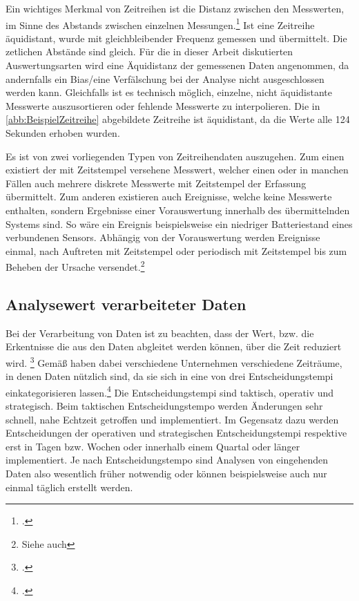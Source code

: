 Ein wichtiges Merkmal von Zeitreihen ist die Distanz zwischen den Messwerten, im Sinne des Abstands zwischen einzelnen Messungen.\footcite[Vgl. auch im Folgenden][201\psq]{Mosler.2006} Ist eine Zeitreihe äquidistant, wurde mit gleichbleibender Frequenz gemessen und übermittelt. Die zetlichen Abstände sind gleich. Für die in dieser Arbeit diskutierten Auswertungsarten wird eine Äquidistanz der gemessenen Daten angenommen, da andernfalls ein Bias/eine Verfälschung bei der Analyse nicht ausgeschlossen werden kann. Gleichfalls ist es technisch möglich, einzelne, nicht äquidistante Messwerte auszusortieren oder fehlende Messwerte zu interpolieren. Die in \autoref{abb:BeispielZeitreihe} abgebildete Zeitreihe ist äquidistant, da die Werte alle 124 Sekunden erhoben wurden.

Es ist von zwei vorliegenden Typen von Zeitreihendaten auszugehen. Zum einen existiert der mit Zeitstempel versehene Messwert, welcher einen oder in manchen Fällen auch mehrere diskrete Messwerte mit Zeitstempel der Erfassung übermittelt. 
Zum anderen existieren auch Ereignisse, welche keine Messwerte enthalten, sondern Ergebnisse einer Vorauswertung innerhalb des übermittelnden Systems sind. 
So wäre ein Ereignis beispielsweise ein niedriger Batteriestand eines verbundenen Sensors. 
Abhängig von der Vorauswertung werden Ereignisse einmal, nach Auftreten mit Zeitstempel oder periodisch mit Zeitstempel bis zum Beheben der Ursache versendet.\footnote{Siehe auch }

\subsection{Analysewert verarbeiteter Daten}\label{chap:datenwert}

Bei der Verarbeitung von Daten ist zu beachten, dass der Wert, bzw. die Erkentnisse die aus den Daten abgleitet werden können, über die Zeit reduziert wird. \footcite[Vgl. auch im Folgenden][]{NucleusResarchInc..2012} Gemäß \citeauthor{NucleusResarchInc..2012} haben dabei verschiedene Unternehmen verschiedene Zeiträume, in denen Daten nützlich sind, da sie sich in eine von drei Entscheidungstempi einkategorisieren lassen.\footcite[Vgl. auch im Folgenden][3]{NucleusResarchInc..2012} Die Entscheidungstempi sind taktisch, operativ und strategisch. Beim taktischen Entscheidungstempo werden Änderungen sehr schnell, nahe Echtzeit getroffen und implementiert. Im Gegensatz dazu werden Entscheidungen der operativen und strategischen Entscheidungstempi respektive erst in Tagen bzw. Wochen oder innerhalb einem Quartal oder länger implementiert. Je nach Entscheidungstempo sind Analysen von eingehenden Daten also wesentlich früher notwendig oder können beispielsweise auch nur einmal täglich erstellt werden.

